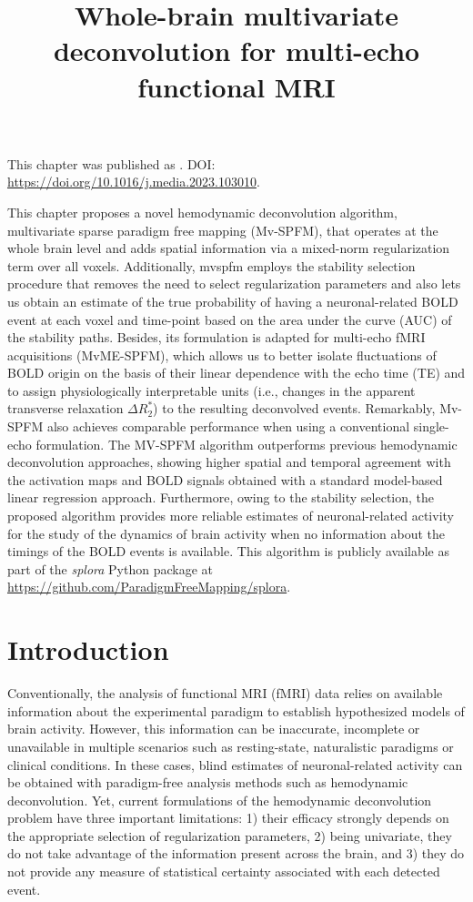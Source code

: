 \title{Whole-brain multivariate deconvolution for multi-echo functional MRI}
\label{cha:multivariate}

\begin{framed}\noindent This chapter was published as
    . DOI:
    \url{https://doi.org/10.1016/j.media.2023.103010}.
\end{framed}

This chapter proposes a novel hemodynamic deconvolution algorithm, multivariate
sparse paradigm free mapping (Mv-SPFM), that operates at the whole brain level
and adds spatial information via a mixed-norm regularization term over all
voxels. Additionally, \acrshort*{mvspfm} employs the stability selection
procedure that removes the need to select regularization parameters and also
lets us obtain an estimate of the true probability of having a neuronal-related
BOLD event at each voxel and time-point based on the area under the curve (AUC)
of the stability paths. Besides, its formulation is adapted for multi-echo fMRI
acquisitions (MvME-SPFM), which allows us to better isolate fluctuations of BOLD
origin on the basis of their linear dependence with the echo time (TE) and to
assign physiologically interpretable units (i.e., changes in the apparent
transverse relaxation $\Delta R_2^*$) to the resulting deconvolved events.
Remarkably, Mv-SPFM also achieves comparable performance when using a
conventional single-echo formulation. The MV-SPFM algorithm outperforms previous
hemodynamic deconvolution approaches, showing higher spatial and temporal
agreement with the activation maps and BOLD signals obtained with a standard
model-based linear regression approach. Furthermore, owing to the stability
selection, the proposed algorithm provides more reliable estimates of
neuronal-related activity for the study of the dynamics of brain activity when
no information about the timings of the BOLD events is available. This algorithm
is publicly available as part of the \textit{splora} Python package at
\url{https://github.com/ParadigmFreeMapping/splora}.

\section{Introduction}
\label{sec:multivariate_introduction}

Conventionally, the analysis of functional MRI (fMRI) data relies on available
information about the experimental paradigm to establish hypothesized models of
brain activity. However, this information can be inaccurate, incomplete or
unavailable in multiple scenarios such as resting-state, naturalistic paradigms
or clinical conditions. In these cases, blind estimates of neuronal-related
activity can be obtained with paradigm-free analysis methods such as hemodynamic
deconvolution. Yet, current formulations of the hemodynamic deconvolution
problem have three important limitations: 1) their efficacy strongly depends on
the appropriate selection of regularization parameters, 2) being univariate,
they do not take advantage of the information present across the brain, and 3)
they do not provide any measure of statistical certainty associated with each
detected event.

